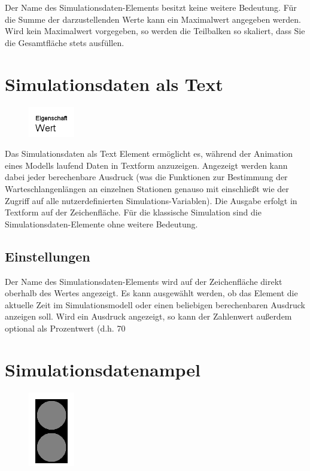 Der Name des Simulationsdaten-Elements besitzt keine weitere Bedeutung.
Für die Summe der darzustellenden Werte kann ein Maximalwert angegeben werden.
Wird kein Maximalwert vorgegeben, so werden die Teilbalken so skaliert,
dass Sie die Gesamtfläche stets ausfüllen.


\section{Simulationsdaten als Text}
\label{ref:ModelElementAnimationText}

\begin{figure}
\vspace{-22pt}
\includegraphics[width=2cm]{imageModelElementAnimationText.png}
\vspace{-22pt}
\end{figure}

Das Simulationsdaten als Text Element ermöglicht es, während der Animation eines Modells laufend Daten in Textform anzuzeigen.
Angezeigt werden kann dabei jeder berechenbare Ausdruck (was die Funktionen zur Bestimmung der Warteschlangenlängen
an einzelnen Stationen genauso mit einschließt wie der Zugriff auf alle nutzerdefinierten Simulations-Variablen).
Die Ausgabe erfolgt in Textform auf der Zeichenfläche. Für die klassische Simulation sind die Simulationsdaten-Elemente
ohne weitere Bedeutung.

\subsection*{Einstellungen}

Der Name des Simulationsdaten-Elements wird auf der Zeichenfläche direkt oberhalb des Wertes angezeigt.
Es kann ausgewählt werden, ob das Element die aktuelle Zeit im Simulationsmodell oder einen beliebigen
berechenbaren Ausdruck anzeigen soll. Wird ein Ausdruck angezeigt, so kann der Zahlenwert außerdem optional
als Prozentwert (d.h. 70%


\section{Simulationsdatenampel}
\label{ref:ModelElementAnimationTrafficLights}

\begin{figure}
\vspace{-22pt}
\includegraphics[width=2cm]{imageModelElementAnimationTrafficLights.png}
\vspace{-22pt}
\end{figure}


